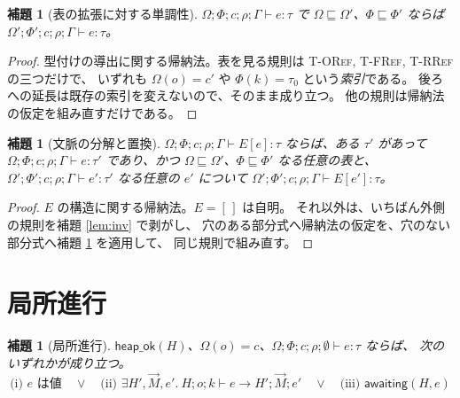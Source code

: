 \documentclass[11pt,a4paper]{ltjsarticle}
\newtheorem{lemma}[theorem]{補題}
\theoremstyle{definition}
\theoremstyle{remark}
\newcommand{\Om}{\Omega}
\newcommand{\Ph}{\Phi}
\newcommand{\heapok}{\textsf{heap\_ok}}
\newcommand{\awaiting}{\textsf{awaiting}}
\begin{document}
\begin{lemma}[表の拡張に対する単調性]\label{lem:mono}
$\Om;\Ph;c;\rho;\Gamma \vdash e : \tau$ で $\Om \sqsubseteq \Om'$、$\Ph \sqsubseteq \Ph'$ ならば
$\Om';\Ph';c;\rho;\Gamma \vdash e : \tau$。
\end{lemma}

\begin{proof}
型付けの導出に関する帰納法。表を見る規則は
\textsc{T-ORef}, \textsc{T-FRef}, \textsc{T-RRef} の三つだけで、
いずれも $\Om(o)=c'$ や $\Ph(k)=\tau_0$ という\emph{索引}である。
後ろへの延長は既存の索引を変えないので、そのまま成り立つ。
他の規則は帰納法の仮定を組み直すだけである。
\end{proof}

\begin{lemma}[文脈の分解と置換]\label{lem:ctx}
$\Om;\Ph;c;\rho;\Gamma \vdash E[e] : \tau$ ならば、ある $\tau'$ があって
$\Om;\Ph;c;\rho;\Gamma \vdash e : \tau'$ であり、かつ
$\Om \sqsubseteq \Om'$、$\Ph \sqsubseteq \Ph'$ なる任意の表と、
$\Om';\Ph';c;\rho;\Gamma \vdash e' : \tau'$ なる任意の $e'$ について
$\Om';\Ph';c;\rho;\Gamma \vdash E[e'] : \tau$。
\end{lemma}

\begin{proof}
$E$ の構造に関する帰納法。$E = [\,]$ は自明。
それ以外は、いちばん外側の規則を補題 \ref{lem:inv} で剥がし、
穴のある部分式へ帰納法の仮定を、穴のない部分式へ補題 \ref{lem:mono} を適用して、
同じ規則で組み直す。
\end{proof}

\section{局所進行}

\begin{lemma}[局所進行]\label{lem:lprog}
$\heapok(H)$、$\Om(o) = c$、$\Om;\Ph;c;\rho;\emptyset \vdash e : \tau$ ならば、
次のいずれかが成り立つ。
\[
\text{(i) $e$ は値}\quad\lor\quad
\text{(ii) $\exists H',\vec{M},e'.\ H;o;k \vdash e \longrightarrow H';\vec{M};e'$}\quad\lor\quad
\text{(iii) $\awaiting(H,e)$}
\]
\end{lemma}
\end{document}
